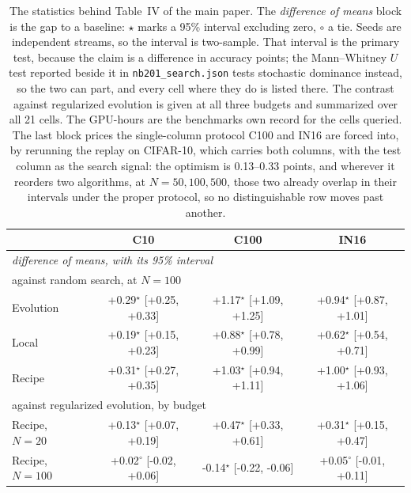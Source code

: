 \begin{table}[t]
\centering
\caption{The statistics behind Table~IV of the main paper. The \emph{difference of means} block is the gap to a baseline: $\star$ marks a 95\% interval excluding zero, $\circ$ a tie. Seeds are independent streams, so the interval is two-sample. That interval is the primary test, because the claim is a difference in accuracy points; the Mann--Whitney $U$ test reported beside it in \texttt{nb201\_search.json} tests stochastic dominance instead, so the two can part, and every cell where they do is listed there. The contrast against regularized evolution is given at all three budgets and summarized over all 21 cells. The GPU-hours are the benchmark\textquotesingle s own record for the cells queried. The last block prices the single-column protocol C100 and IN16 are forced into, by rerunning the replay on CIFAR-10, which carries both columns, with the test column as the search signal: the optimism is 0.13--0.33 points, and wherever it reorders two algorithms, at $N{=}50, 100, 500$, those two already overlap in their intervals under the proper protocol, so no distinguishable row moves past another.}
\label{tab:search_sm}
\footnotesize
\setlength{\tabcolsep}{3.0pt}
\begin{tabular}{l ccc}
\toprule
 & C10 & C100 & IN16 \\
\midrule
\multicolumn{4}{l}{\emph{difference of means, with its 95\% interval}} \\
\multicolumn{4}{l}{\quad\footnotesize against random search, at $N{=}100$} \\
\quad Evolution & +0.29$^{\star}$ \tiny[+0.25, +0.33] & +1.17$^{\star}$ \tiny[+1.09, +1.25] & +0.94$^{\star}$ \tiny[+0.87, +1.01] \\
\quad Local & +0.19$^{\star}$ \tiny[+0.15, +0.23] & +0.88$^{\star}$ \tiny[+0.78, +0.99] & +0.62$^{\star}$ \tiny[+0.54, +0.71] \\
\quad Recipe & +0.31$^{\star}$ \tiny[+0.27, +0.35] & +1.03$^{\star}$ \tiny[+0.94, +1.11] & +1.00$^{\star}$ \tiny[+0.93, +1.06] \\
\multicolumn{4}{l}{\quad\footnotesize against regularized evolution, by budget} \\
\quad Recipe, $N{=}20$ & +0.13$^{\star}$ \tiny[+0.07, +0.19] & +0.47$^{\star}$ \tiny[+0.33, +0.61] & +0.31$^{\star}$ \tiny[+0.15, +0.47] \\
\quad Recipe, $N{=}100$ & +0.02$^{\circ}$ \tiny[-0.02, +0.06] & -0.14$^{\star}$ \tiny[-0.22, -0.06] & +0.05$^{\circ}$ \tiny[-0.01, +0.11] \\

\end{tabular}
\end{table}
